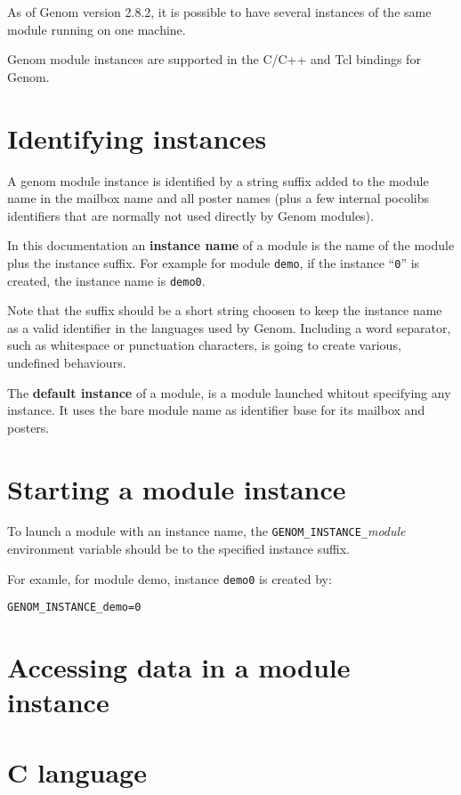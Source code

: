 As of Genom version 2.8.2, it is possible to have several instances of
the same module running on one machine. 

Genom module instances are supported in the C/C++ and Tcl bindings for
Genom.

\section{Identifying instances}

A genom module instance is identified by a string suffix added to the
module name in the mailbox name and all poster names (plus a few
internal pocolibs identifiers that are normally not used directly by
Genom modules). 

In this documentation an \textbf{instance name} of a module is the
name of the module plus the instance suffix. 
For example for module \texttt{demo}, if the instance ``\texttt{0}''
is created, the instance name is \texttt{demo0}.

Note that the suffix should be a short string choosen to keep the
instance name as a valid identifier in the languages used by
Genom. Including a word separator, such as whitespace or punctuation
characters, is going to create various, undefined behaviours. 

The \textbf{default instance} of a module, is a module launched
whitout specifying any instance. It uses the bare module name as
identifier base for its mailbox and posters.

\section{Starting a module instance}

To launch a module with an instance name,  the
\texttt{GENOM\_INSTANCE\_}\textit{module} environment variable should
be to the specified instance suffix. 

For examle, for module demo, instance \texttt{demo0} is created by:

\texttt{GENOM\_INSTANCE\_demo=0}

\section{Accessing data in a module instance}

\section{C language}

